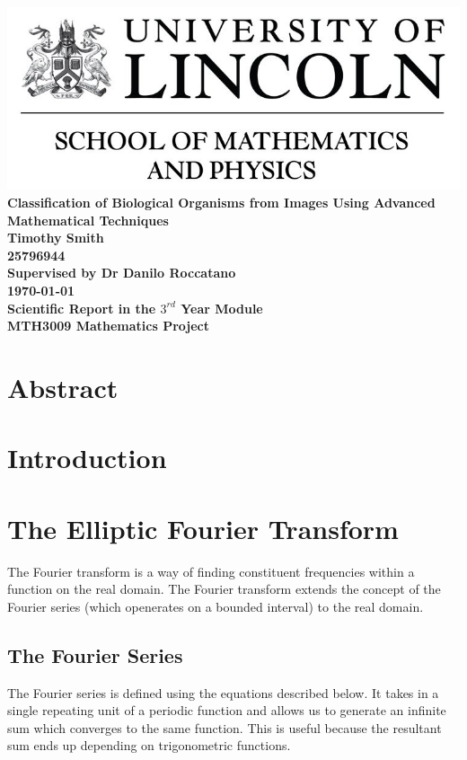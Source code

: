 \documentclass[12pt,english]{article}
\begin{document}
\begin{center}
\includegraphics[scale = 0.5]{LincolnLogo}
\newline\newline
\thispagestyle{empty}
    \textbf{\huge{Classification of Biological Organisms from Images Using Advanced Mathematical Techniques} \\
    [100pt] \Large{Timothy Smith\\25796944} \\
    [40pt]\LARGE{Supervised by Dr Danilo Roccatano}\\
    [50pt]\today \\
	[40pt]Scientific Report in the $3^{rd}$ Year Module\\ MTH3009 Mathematics Project  }
\end{center}

\newpage
\section*{Abstract}

\newpage
\tableofcontents

\section{Introduction}
\section{The Elliptic Fourier Transform}
The Fourier transform is a way of finding constituent frequencies within a function on the real domain.
The Fourier transform extends the concept of the Fourier series (which openerates on a bounded interval) to the real
domain.

\subsection{The Fourier Series}
The Fourier series is defined using the equations described below.
It takes in a single repeating unit of a periodic function and allows us to generate an infinite sum which converges
to the same function. This is useful because the resultant sum ends up depending on trigonometric functions.
\end{document}
